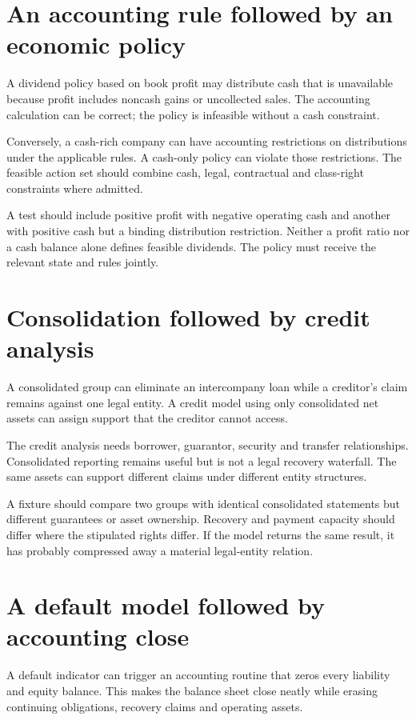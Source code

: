 \section{An accounting rule followed by an economic policy}
A dividend policy based on book profit may distribute cash that is unavailable because profit includes noncash gains or uncollected sales. The accounting calculation can be correct; the policy is infeasible without a cash constraint.

Conversely, a cash-rich company can have accounting restrictions on distributions under the applicable rules. A cash-only policy can violate those restrictions. The feasible action set should combine cash, legal, contractual and class-right constraints where admitted.

A test should include positive profit with negative operating cash and another with positive cash but a binding distribution restriction. Neither a profit ratio nor a cash balance alone defines feasible dividends. The policy must receive the relevant state and rules jointly.

\section{Consolidation followed by credit analysis}
A consolidated group can eliminate an intercompany loan while a creditor's claim remains against one legal entity. A credit model using only consolidated net assets can assign support that the creditor cannot access.

The credit analysis needs borrower, guarantor, security and transfer relationships. Consolidated reporting remains useful but is not a legal recovery waterfall. The same assets can support different claims under different entity structures.

A fixture should compare two groups with identical consolidated statements but different guarantees or asset ownership. Recovery and payment capacity should differ where the stipulated rights differ. If the model returns the same result, it has probably compressed away a material legal-entity relation.

\section{A default model followed by accounting close}
A default indicator can trigger an accounting routine that zeros every liability and equity balance. This makes the balance sheet close neatly while erasing continuing obligations, recovery claims and operating assets.

